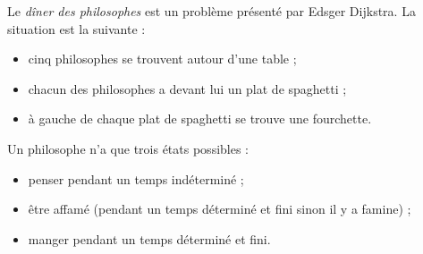 \documentclass[a4paper,11pt]{article}
\begin{document}
\begin{Form}
Le \emph{dîner des philosophes} est un problème présenté par  Edsger Dijkstra.
La situation est la suivante :
\begin{itemize}
\item cinq philosophes se trouvent autour d'une table ;
\item chacun des philosophes a devant lui un plat de spaghetti ;
\item à gauche de chaque plat de spaghetti se trouve une fourchette.
\end{itemize}

Un philosophe n'a que trois états possibles :
\begin{itemize}
\item penser pendant un temps indéterminé ;
\item être affamé (pendant un temps déterminé et fini sinon il y a famine) ;
\item manger pendant un temps déterminé et fini.
\end{itemize}


\end{Form}
\end{document}

